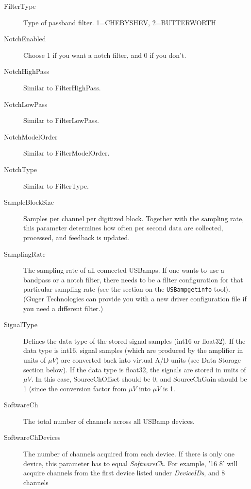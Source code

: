 \documentclass[letterpaper, oneside, 12pt]{article}
\begin{document}
\begin{description}
 \item [FilterType]     Type of passband filter. 1=CHEBYSHEV, 2=BUTTERWORTH
 \item [NotchEnabled]   Choose 1 if you want a notch filter,
                        and 0 if you don't.
 \item [NotchHighPass]     Similar to FilterHighPass.
 \item [NotchLowPass]      Similar to FilterLowPass.
 \item [NotchModelOrder]   Similar to FilterModelOrder.
 \item [NotchType]         Similar to FilterType.
 \item [SampleBlockSize]   Samples per channel per digitized block. Together with the sampling rate,
                           this parameter determines how often per second data are collected, processed,
                           and feedback is updated.
 \item [SamplingRate]      The sampling rate of all connected USBamps. If one wants to 
                           use a bandpass or a notch filter, there needs to be a filter
                           configuration for that particular sampling rate (see the section
                           on the \texttt{USBampgetinfo} tool). (Guger Technologies can
                           provide you with a new driver configuration file if you need
                           a different filter.)
 \item [SignalType]        Defines the data type of the stored signal samples (int16 or float32).
                           If the data type is int16, signal samples (which are produced by
                           the amplifier in units of $\mu V$) are converted back into virtual A/D units
                           (see Data Storage section below). If the data type is float32, the signals
                           are stored in units of $\mu V$.
                           In this case, SourceChOffset should be 0, and SourceChGain should be
                           1 (since the conversion factor from $\mu V$ into $\mu V$ is 1. 
 \item [SoftwareCh]        The total number of channels across all USBamp devices.
 \item [SoftwareChDevices] The number of channels acquired from each device. 
                           If there is only one device, this parameter has to equal \textit{SoftwareCh}.
                           For example, '16 8' will acquire channels from the 
                           first device listed under \textit{DeviceIDs}, and 8 channels

\end{description}
\end{document}

